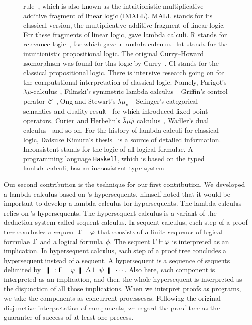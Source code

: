 \begin{figure}
{  rule~\citep[p.86]{residuated}, which is also known as the
  intuitionistic
  multiplicative additive fragment of linear logic (IMALL).
  \textsf{MALL} stands for its classical version, the multiplicative
  additive fragment of linear logic.  For these fragments of linear
  logic,
  \citet{abramsky1993computational} gave lambda calculi.
  \textsf{R} stands for relevance logic~\citep{urquhart1972},
  for which \citet{gabbay1992} gave a lambda calculus.
  \textsf{Int} stands for the intuitionistic propositional logic.
  The original Curry--Howard isomorphism was found for this logic by
  Curry~\citep{curry1942}.
  \textsf{Cl} stands for the classical propositional logic.
  There is intensive research going on for the computational
  interpretation of classical logic.  Namely,
  Parigot's $\lambda\mu$-calculus~\citep{lambdamu},
  Filinski's symmetric lambda calculus~\citep{filinski1989},
  Griffin's control perator~$\mathcal C$~\citep{griffin1990},
  Ong and Stewart's $\lambda\mu_{\mathrm
  v}$~\citep{ong-stewart},
  Selinger's categorical semantics and duality
  result~\citep{selinger2001} for which \citet{kakutani2002} introduced
  fixed-point
  operators,
  Curien and Herbelin's $\bar\lambda\mu\tilde\mu$
  calculus~\citep{curien2000},
  Wadler's dual calculus~\citep{wadler-dual, wadler-reloaded} and so on.
  For the history of lambda calculi for classical logic,
  Daisuke Kimura's thesis~\cite{kimura} is a source of detailed
  information.
  \textsf{Inconsistent} stands for the logic of all logical formulae.
  A programming language \texttt{Haskell}, which is based on
  the typed lambda calculi, has
  an inconsistent type system.
  }
  \label{fig:lattice}
 \end{figure}

Our second contribution is the technique for our first contribution.
We developed a lambda calculus based on \citet{avron91}'s hypersequents.
\citet{avron91} himself noted that it would be important to develop a
lambda calculus for hypersequents.
The lambda calculus relies on \citet{avron91}'s hypersequents.
The hypersequent calculus is a
variant of the deduction system called sequent calculus.  In sequent
calculus, each step of a proof tree concludes a sequent $\Gamma\vdash\varphi$ that
consists of a finite sequence of logical formulae~$\Gamma$ and a logical
formula~$\phi$.  The sequent $\Gamma\vdash\varphi$ is
interpreted as an implication.  In hypersequent calculus, each step of a
proof tree concludes a hypersequent instead of a sequent.  A
hypersequent is a sequence of sequents delimited by $\hmid$:
$\G\vdash\phi\hmid \D\vdash\psi
\hmid \cdots$.  Also here, each component is interpreted as an
implication, and then the whole hypersequent is interpreted as the
disjunction of all those implications.
When we interpret proofs as programs, we take the components as
concurrent processeses.  Following the original disjunctive
interpretation of components, we regard the proof tree as the guarantee of
success of at least one process.

